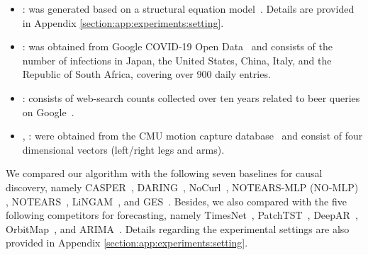 {\setlength{\leftmargini}{15pt}
\begin{itemize}
    \item
    \psynthetic:
    was generated based on a structural equation model~\cite{pearl2009causality}.
    Details
    are provided in Appendix \ref{section:app:experiments:setting}.
    \item
    \pcovid: was obtained from Google COVID-19 Open Data~\cite{googlecovid19}
    and consists of the number of infections in Japan, the United States, China, Italy, and the Republic of South Africa, covering over 900 daily entries.
    \item
    \pgoogletrend: consists of web-search counts collected over ten years related to beer queries on Google~\cite{gooogletrend}.
    \item
    \pchickendance, \pexercise: were obtained from the CMU motion capture database~\cite{cmumocap}
    and consist of four dimensional vectors (left/right legs and arms).
\end{itemize}
}
\noindent
We compared our algorithm with the following seven baselines for causal discovery, 
namely
CASPER~\cite{liu2023discovering},
DARING~\cite{he2021daring},
NoCurl~\cite{yu2021dag},
NOTEARS-MLP
(NO-MLP)
\cite{zheng2020learning},
NOTEARS~\cite{zheng2018dags},
LiNGAM~\cite{shimizu2006linear}, and
GES~\cite{chickering2002optimal}.
Besides, we also compared with the five following competitors for forecasting, namely
TimesNet~\cite{wu2023timesnet},
PatchTST~\cite{Yuqietal-2023-PatchTST},
DeepAR~\cite{salinas2020deepar},
OrbitMap~\cite{matsubara2019dynamic}, and
ARIMA~\cite{box1976arima}.
Details regarding the experimental
settings are also provided in Appendix \ref{section:app:experiments:setting}.
\par

